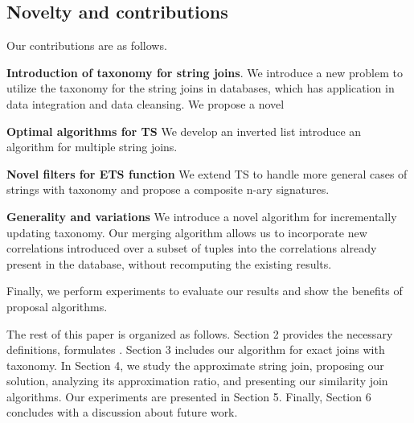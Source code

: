 



\subsection{Novelty and contributions}


\smallskip


Our contributions are as follows.

\noindent \textbf{Introduction of taxonomy for string joins}. We introduce a new problem to utilize the taxonomy for the string joins in databases, which has application in data integration and data cleansing. We propose a novel

\noindent \textbf{Optimal algorithms for TS} We develop an inverted list introduce an algorithm for multiple string joins.

\noindent \textbf{Novel filters for ETS function} We extend TS to handle more general cases of strings with taxonomy and propose a composite n-ary signatures.

\noindent \textbf{Generality and variations}  We introduce a novel algorithm for incrementally updating taxonomy. Our merging algorithm allows us to incorporate new correlations introduced over a subset of tuples into
the correlations already present in the database, without recomputing the existing results.


Finally, we perform experiments to evaluate our results and show the benefits of proposal algorithms.


\smallskip

The rest of this paper is organized as follows. Section 2
provides the necessary definitions, formulates . Section
3 includes our algorithm for exact joins with taxonomy. In Section 4, we study
the approximate string join, proposing our solution, analyzing its approximation
ratio, and presenting our similarity join algorithms.
Our experiments are presented in Section 5. Finally,
Section 6 concludes with a discussion about future work.
